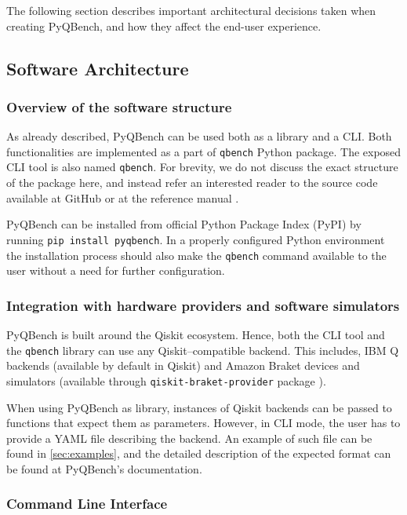 \documentclass[preprint,12pt, a4paper, dvipsnames]{elsarticle}
\newcommand{\1}{{\rm 1\hspace{-0.9mm}l}}
\theoremstyle{definition}
\begin{document}
The following section describes important architectural decisions taken when creating PyQBench, and
how they affect the end-user experience.

\subsection{Software Architecture}\label{sec:sortware-architecture}

\subsubsection{Overview of the software structure}
As already described, PyQBench can be used both as a library and a CLI. Both functionalities are
implemented as a part of \texttt{qbench} Python package. The exposed CLI tool is also named
\texttt{qbench}. For brevity, we do not discuss the exact structure of the package here, and instead
refer an interested reader to the source code available at GitHub \cite{pyqbenchgithub} or at the reference manual
\cite{pyqbenchdocs}.

PyQBench can be installed from official Python Package Index (PyPI) by running \texttt{pip install
pyqbench}. In a properly configured Python environment the installation process should also make the
\texttt{qbench} command available to the user without a need for further configuration.

\subsubsection{Integration with hardware providers and software simulators}

PyQBench is built around the Qiskit \cite{qiskit} ecosystem. Hence, both the CLI tool and the
\texttt{qbench} library can use any Qiskit--compatible backend. This includes, IBM Q
backends (available by default in Qiskit) and Amazon Braket devices and simulators (available
through \texttt{qiskit-braket-provider} package \cite{qiskit-braket-provider, qiskit-braket-provider-github}).

When using PyQBench as library, instances of Qiskit backends can be passed to functions that expect
them as parameters. However, in CLI mode, the user has to provide a YAML file describing the
backend. An example of such file can be found in \ref{sec:examples}, and the detailed description of
the expected format can be found at PyQBench's documentation.

\subsubsection{Command Line Interface}
\label{sec:cli}
\end{document}
